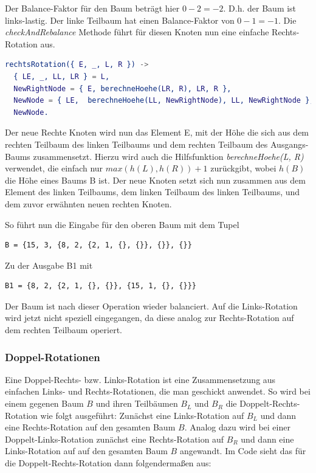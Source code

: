 \documentclass{article}
\begin{document}
	Der Balance-Faktor für den Baum beträgt hier $0 - 2 = -2$. D.h. der Baum ist links-lastig. Der linke Teilbaum hat einen Balance-Faktor von $0 - 1 = -1$. Die \textit{checkAndRebalance} Methode führt für diesen Knoten nun eine einfache Rechts-Rotation aus.
	
	\begin{lstlisting}[language=erlang]
rechtsRotation({ E, _, L, R }) ->
  { LE, _, LL, LR } = L,
  NewRightNode = { E, berechneHoehe(LR, R), LR, R },
  NewNode = { LE,  berechneHoehe(LL, NewRightNode), LL, NewRightNode },
  NewNode.
	\end{lstlisting}
  
  	Der neue Rechte Knoten wird nun das Element E, mit der Höhe die sich aus dem rechten Teilbaum des linken Teilbaums und dem rechten Teilbaum des Ausgangs-Baums zusammensetzt. Hierzu wird auch die Hilfsfunktion \textit{berechneHoehe(L, R)} verwendet, die einfach nur $max(h(L), h(R)) + 1$ zurückgibt, wobei $h(B)$ die Höhe eines Baums B ist.
  	Der neue Knoten setzt sich nun zusammen aus dem Element des linken Teilbaums, dem linken Teilbaum des linken Teilbaums, und dem zuvor erwähnten neuen rechten Knoten.
  	
  	So führt nun die Eingabe für den oberen Baum mit dem Tupel 
  	\begin{lstlisting}
B = {15, 3, {8, 2, {2, 1, {}, {}}, {}}, {}}
  	\end{lstlisting}
	Zu der Ausgabe B1 mit 
	\begin{lstlisting}
B1 = {8, 2, {2, 1, {}, {}}, {15, 1, {}, {}}}
	\end{lstlisting}
  	
  	Der Baum ist nach dieser Operation wieder balanciert.
  	Auf die Links-Rotation wird jetzt nicht speziell eingegangen, da diese analog zur Rechts-Rotation auf dem rechten Teilbaum operiert.
  	
	\subsubsection{Doppel-Rotationen}
	
	Eine Doppel-Rechts- bzw. Links-Rotation ist eine Zusammensetzung aus einfachen Links- und Rechts-Rotationen, die man geschickt anwendet. So wird bei einem gegenen Baum $B$ und ihren Teilbäumen $B_L$ und $B_R$ die Doppelt-Rechts-Rotation wie folgt ausgeführt: Zunächst eine Links-Rotation auf $B_L$ und dann eine Rechts-Rotation auf den gesamten Baum $B$. Analog dazu wird bei einer Doppelt-Links-Rotation zunächst eine Rechts-Rotation auf $B_R$ und dann eine Links-Rotation auf auf den gesamten Baum $B$ angewandt.
	Im Code sieht das für die Doppelt-Rechts-Rotation dann folgendermaßen aus:
	
\end{document}
